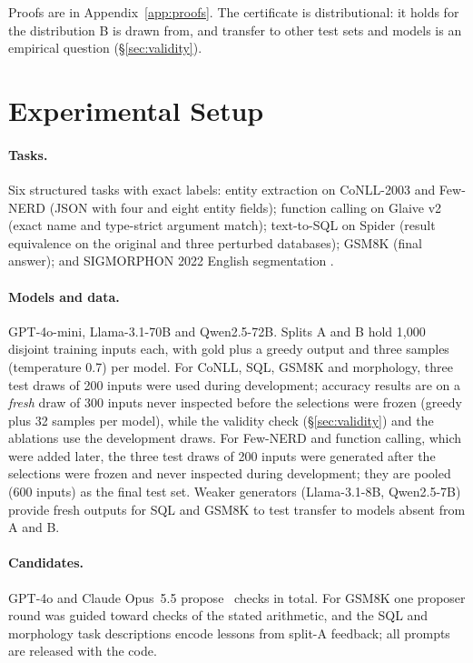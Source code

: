 \documentclass[11pt]{article}
\begin{document}
\noindent Proofs are in Appendix~\ref{app:proofs}. The certificate is
distributional: it holds for the distribution B is drawn from, and transfer
to other test sets and models is an empirical question (\S\ref{sec:validity}).

\section{Experimental Setup}\label{sec:exp}
\paragraph{Tasks.} Six structured tasks with exact labels: entity
extraction on CoNLL-2003 \citep{tjongkimsang2003conll} and Few-NERD
\citep{ding2021fewnerd} (JSON with four and eight entity fields); function
calling on Glaive v2 \citep{glaive2023fc} (exact name and type-strict
argument match); text-to-SQL on Spider \citep{yu2018spider} (result
equivalence on the original and three perturbed databases); GSM8K
\citep{cobbe2021gsm8k} (final answer); and SIGMORPHON 2022 English
segmentation \citep{batsuren2022sigmorphon}.

\paragraph{Models and data.} GPT-4o-mini, Llama-3.1-70B and Qwen2.5-72B.
Splits A and B hold 1{,}000 disjoint training inputs each, with gold plus a
greedy output and three samples (temperature 0.7) per model. For CoNLL, SQL,
GSM8K and morphology, three test draws of 200 inputs were used during
development; accuracy results are on a \emph{fresh} draw of 300 inputs
never inspected before the selections were frozen (greedy plus 32 samples
per model), while the validity check (\S\ref{sec:validity}) and the
ablations use the development draws. For Few-NERD and function calling, which were added
later, the three test draws of 200 inputs were generated after the
selections were frozen and never inspected during development; they are
pooled (600 inputs) as the final test set.
Weaker generators (Llama-3.1-8B, Qwen2.5-7B) provide fresh outputs for SQL
and GSM8K to test transfer to models absent from A and B.

\paragraph{Candidates.} GPT-4o and Claude Opus~5.5 propose \candTotal\
checks in total. For GSM8K one proposer round was guided toward checks of
the stated arithmetic, and the SQL and morphology task descriptions encode
lessons from split-A feedback; all prompts are released with the code.
\end{document}

